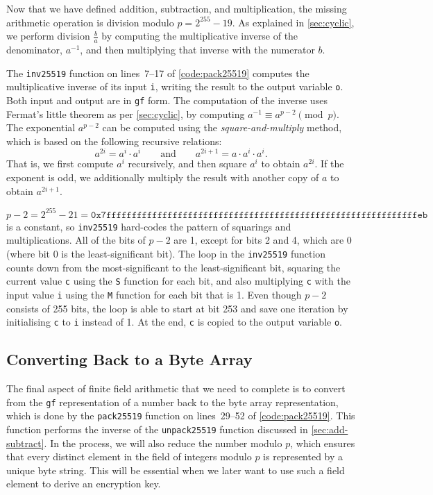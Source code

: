 \documentclass{article}
\begin{document}
Now that we have defined addition, subtraction, and multiplication, the missing arithmetic operation is division modulo $p=2^{255}-19$.
As explained in \autoref{sec:cyclic}, we perform division $\frac{b}{a}$ by computing the multiplicative inverse of the denominator, $a^{-1}$, and then multiplying that inverse with the numerator $b$.

The \verb|inv25519| function on lines~7--17 of \autoref{code:pack25519} computes the multiplicative inverse of its input \verb|i|, writing the result to the output variable \verb|o|.
Both input and output are in \verb|gf| form.
The computation of the inverse uses Fermat's little theorem as per \autoref{sec:cyclic}, by computing $a^{-1} \equiv a^{p-2} \pmod{p}$.
The exponential $a^{p-2}$ can be computed using the \emph{square-and-multiply} method, which is based on the following recursive relations:
\[ a^{2i} = a^i \cdot a^i \qquad\text{and}\qquad a^{2i+1} = a \cdot a^i \cdot a^i. \]
That is, we first compute $a^i$ recursively, and then square $a^i$ to obtain $a^{2i}$.
If the exponent is odd, we additionally multiply the result with another copy of $a$ to obtain $a^{2i+1}$.

$p-2 = 2^{255}-21 = \texttt{0x7fffffffffffffffffffffffffffffffffffffffffffffffffffffffffffffeb}$ is a constant, so \verb|inv25519| hard-codes the pattern of squarings and multiplications.
All of the bits of $p-2$ are 1, except for bits 2 and 4, which are 0 (where bit 0 is the least-significant bit).
The loop in the \verb|inv25519| function counts down from the most-significant to the least-significant bit, squaring the current value \verb|c| using the \verb|S| function for each bit, and also multiplying \verb|c| with the input value \verb|i| using the \verb|M| function for each bit that is 1.
Even though $p-2$ consists of 255 bits, the loop is able to start at bit 253 and save one iteration by initialising \verb|c| to \verb|i| instead of 1.
At the end, \verb|c| is copied to the output variable \verb|o|.

\subsection{Converting Back to a Byte Array}\label{sec:pack}

The final aspect of finite field arithmetic that we need to complete is to convert from the \verb|gf| representation of a number back to the byte array representation, which is done by the \verb|pack25519| function on lines~29--52 of \autoref{code:pack25519}.
This function performs the inverse of the \verb|unpack25519| function discussed in \autoref{sec:add-subtract}.
In the process, we will also reduce the number modulo $p$, which ensures that every distinct element in the field of integers modulo $p$ is represented by a unique byte string.
This will be essential when we later want to use such a field element to derive an encryption key.
\end{document}
